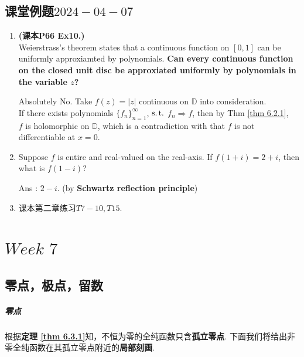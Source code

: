 \newpage

\section{课堂例题$2024-04-07$}
\begin{enumerate}
	\item \textbf{(课本P66 Ex10.)}\\
	Weierstrass's theorem states that a continuous function on $[0 , 1]$ can be uniformly approxiamted by polynomials. \textbf{Can every continuous function on the closed unit disc be approxiated uniformly by polynomials in the variable $z$?}
	
	\vspace{2em}
	
	\begin{solution}
		Absolutely No. Take $f(z) = \left| z \right|$ continuous on $\mathbb{D}$ into consideration. \\
		If there exists polynomials $\{ f_n \}_{n = 1}^{\infty}$, $\operatorname{s.t.}$ $f_n \Rightarrow f$, then by Thm \ref{thm 6.2.1}, \\
		$f$ is holomorphic on $\mathbb{D}$, which is a contradiction with that $f$ is not differentiable at $x = 0$.
	\end{solution}

	\vspace{2em}
	
	\item Suppose $f$ is entire and real-valued on the real-axis. If $f(1 + i) = 2 + i$, then what is $f(1 - i)$?
	
	\vspace{2em}
	
	\begin{solution}
		Ans : $2 - i$. (by \textbf{Schwartz reflection principle})
	\end{solution}

	\vspace{2em}
	
	\item 课本第二章练习$T7-10 , T15$.
\end{enumerate}

\chapter{$Week \,\, 7$}
\section{零点，极点，留数}
\paragraph{零点}
	根据\textbf{定理 \ref{thm 6.3.1}}知，不恒为零的全纯函数只含\textbf{孤立零点}. 下面我们将给出非零全纯函数在其孤立零点附近的\textbf{局部刻画}.
	
